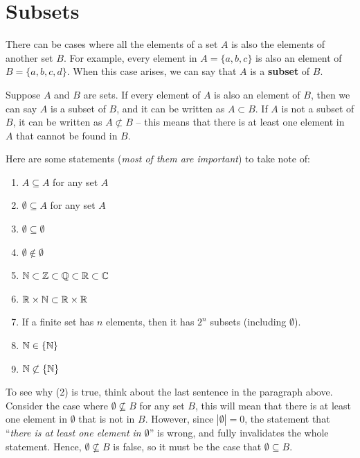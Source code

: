 \documentclass[../Latex-Setup/setup.tex]{subfiles}
\begin{document}
\section{Subsets}

\indent There can be cases where all the elements of a set $A$ is also the elements of another set $B$. For example,
every element in $A = \{a,b,c\}$ is also an element of $B = \{a,b,c,d\}$. When this case arises, we can say that $A$ is a \textbf{subset} of $B$.\par

\indent Suppose $A$ and $B$ are sets. If every element of $A$ is also an element of $B$, then we can say $A$ is a subset of $B$,
and it can be written as $A \subset B$. If $A$ is not a subset of $B$, it can be written as $A \not\subset B$ -- this means
that there is at least one element in $A$ that cannot be found in $B$.\par

\indent Here are some statements (\textit{most of them are important}) to take note of:
\begin{enumerate}
    \item $A \subseteq A$ for any set $A$
    \item $\emptyset \subseteq A$ for any set $A$
    \item $\emptyset \subseteq \emptyset$
    \item $\emptyset \notin \emptyset$
    \item $\mathbb N \subset \mathbb Z \subset \mathbb Q \subset \mathbb R \subset \mathbb C$
    \item $\mathbb R \times \mathbb N \subset \mathbb R \times \mathbb R$
    \item If a finite set has $n$ elements, then it has $2^n$ subsets (including $\emptyset$).
    \item $\mathbb N \in \{\mathbb N\}$
    \item $\mathbb N \not\subset \{\mathbb N\}$
\end{enumerate}
\par

\indent To see why (2) is true, think about the last sentence in the paragraph above. Consider the case where $\emptyset \not\subseteq B$ for any set $B$,
this will mean that there is at least one element in $\emptyset$ that is not in $B$. However, since $|\emptyset| = 0$, the statement that
``\textit{there is at least one element in $\emptyset$}'' is wrong, and fully invalidates the whole statement.
Hence, $\emptyset \not\subseteq B$ is false, so it must be the case that $\emptyset \subseteq B$.\par
\end{document}
